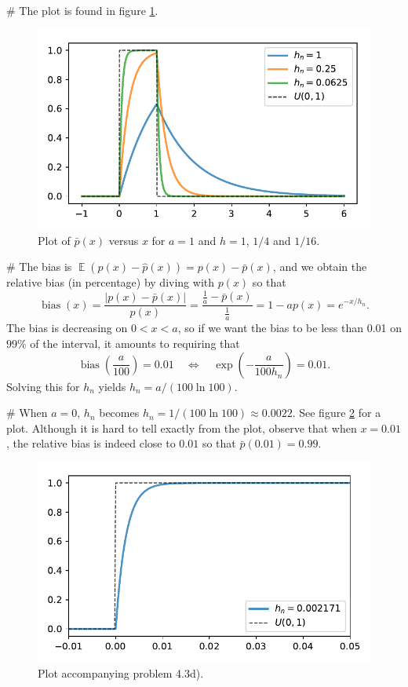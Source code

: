 \documentclass[12pt, a4paper]{article}
\newcommand{\abs}[1]{\left\lvert#1\right\rvert}
\DeclareMathOperator{\E}{\mathbb{E}}
\begin{document}
\begin{easylist}[enumerate]
 
# The plot is found in figure \ref{fig:duda_ch4_prob3_b}.
\begin{figure}[ht!]
\centering
\includegraphics[width=0.5\linewidth]{figs/duda_ch4_prob3_b}
\caption{Plot of $\bar{p}(x)$ versus $x$ for $a=1$ and $h=1$, $1/4$ and $1/16$.}
\label{fig:duda_ch4_prob3_b}
\end{figure}

# The bias is $\E(p(x) - \hat{p}(x)) = p(x) - \bar{p}(x)$, and we obtain the relative bias (in percentage) by diving with $p(x)$ so that
\begin{equation*}
	\operatorname{bias}(x) = \frac{\abs{p(x) - \bar{p}(x)}}{p(x)}
	= \frac{\frac{1}{a} - \bar{p}(x)}{\frac{1}{a}} = 1 - ap(x) = e^{-x / h_n}.
\end{equation*}
The bias is decreasing on $0 < x < a$, so if we want the bias to be less than 0.01 on $99\%$ of the interval, it amounts to requiring that
\begin{equation*}
	\operatorname{bias} \left( \frac{a}{100} \right) = 0.01 
	\quad \Leftrightarrow \quad \exp \left( - \frac{a}{100 h_n} \right) = 0.01.
\end{equation*}
Solving this for $h_n$ yields $h_n = a / (100 \ln 100)$.


# When $a=0$, $h_n$ becomes $h_n = 1 / (100 \ln 100) \approx 0.0022$.
See figure \ref{fig:duda_ch4_prob3_d} for a plot.
Although it is hard to tell exactly from the plot, observe that when $x = 0.01$, the relative bias is indeed close to $0.01$ so that $\bar{p}(0.01) = 0.99$.


\begin{figure}[ht!]
\centering
\includegraphics[width=0.5\linewidth]{figs/duda_ch4_prob3_d}
\caption{Plot accompanying problem 4.3d).}
\label{fig:duda_ch4_prob3_d}
\end{figure}

\end{easylist}
\end{document}
